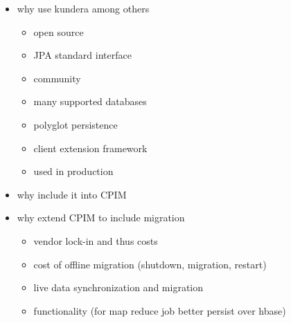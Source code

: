 \begin{itemize}
\item why use kundera among others
\begin{itemize}	
\item open source
\item JPA standard interface
\item community
\item many supported databases
\item polyglot persistence
\item client extension framework
\item used in production
\end{itemize}
\item why include it into CPIM
\item why extend CPIM to include migration
\begin{itemize}	
\item vendor lock-in and thus costs
\item cost of offline migration (shutdown, migration, restart)
\item live data synchronization and migration
\item functionality (for map reduce job better persist over hbase)
\end{itemize}
\end{itemize}